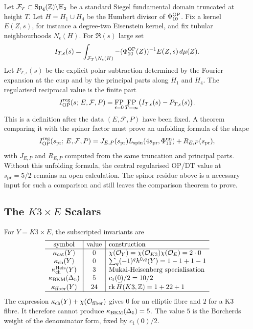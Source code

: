 Let \(\mathcal F_T\subset \mathrm{Sp}_4(\mathbb{Z})\backslash\mathbb{H}_2\) be a standard
Siegel fundamental domain truncated at height \(T\).  Let
\(H=H_1\cup H_4\) be the Humbert divisor of \(\Phi_{10}^{\mathrm{OP}}\).  Fix
a kernel \(E(Z,s)\), for instance a degree-two Eisenstein kernel, and
fix tubular neighbourhoods \(N_\epsilon(H)\).  For \(\Re(s)\) large set
\[
        I_{T,\epsilon}(s)
        =
        \int_{\mathcal F_T\setminus N_\epsilon(H)}
        -(\Phi_{10}^{\mathrm{OP}}(Z))^{-1}E(Z,s)\,d\mu(Z).
\]
Let \(P_{T,\epsilon}(s)\) be the explicit polar subtraction determined
by the Fourier expansion at the cusp and by the principal parts along
\(H_1\) and \(H_4\).  The regularised reciprocal value is the finite
part
\[
        I_{\mathrm{OP}}^{\mathrm{reg}}(s;\,E,\mathcal F,P)
        =
        \operatorname*{FP}_{\epsilon=0}
        \operatorname*{FP}_{T=\infty}
        \bigl(I_{T,\epsilon}(s)-P_{T,\epsilon}(s)\bigr).
\]
This is a definition after the data \((E,\mathcal F,P)\) have been
fixed.  A theorem comparing it with the spinor factor must prove an
unfolding formula of the shape
\[
        I_{\mathrm{OP}}^{\mathrm{reg}}(s_{\mathrm{pr}};\,E,\mathcal F,P)
        =
        J_{E,P}(s_{\mathrm{pr}})
        L_{\mathrm{spin}}(4s_{\mathrm{pr}},\Phi_{10}^{\mathrm{un}})
        +R_{E,P}(s_{\mathrm{pr}}),
\]
with \(J_{E,P}\) and \(R_{E,P}\) computed from the same truncation and
principal parts.  Without this unfolding formula, the central
regularised OP/DT value at \(s_{\mathrm{pr}}=5/2\) remains an open
calculation.  The spinor residue above is a necessary input for such a
comparison and still leaves the comparison theorem to prove.

\subsection*{The \(K3\times E\) Scalars}

For \(Y=K3\times E\), the subscripted invariants are
\[
\begin{array}{c|c|l}
\hline
\text{symbol} & \text{value} & \text{construction}\\
\hline
\kappa_{\mathrm{cat}}(Y) & 0 &
\chi(\mathcal{O}_Y)=\chi(\mathcal{O}_{K3})\chi(\mathcal{O}_E)=2\cdot0\\
\kappa_{\mathrm{ch}}(Y) & 0 &
\sum_q(-1)^qh^{0,q}(Y)=1-1+1-1\\
\kappa_{\mathrm{ch}}^{\mathrm{Heis}}(Y) & 3 &
\text{Mukai-Heisenberg specialisation}\\
\kappa_{\mathrm{BKM}}(\Delta_5) & 5 &
c_1(0)/2=10/2\\
\kappa_{\mathrm{fiber}}(Y) & 24 &
\operatorname{rk}\widetilde H(K3,\mathbb{Z})=1+22+1\\
\hline
\end{array}
\]
The expression \(\kappa_{\mathrm{ch}}(Y)+\chi(\mathcal{O}_{\mathrm{fiber}})\) gives \(0\) for
an elliptic fibre and \(2\) for a K3 fibre.  It therefore cannot
produce \(\kappa_{\mathrm{BKM}}(\Delta_5)=5\).  The value \(5\) is the Borcherds weight
of the denominator form, fixed by \(c_1(0)/2\).

